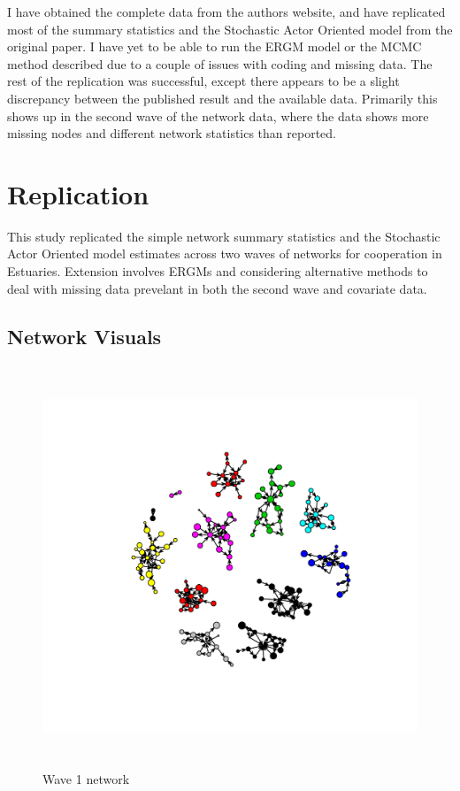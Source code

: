 \documentclass[12pt]{article} %
\numberwithin{equation}{section}		%
\numberwithin{figure}{section}			%
\numberwithin{table}{section}				%
\begin{document}
I have obtained the complete data from the authors website, and have replicated most of the summary statistics and the Stochastic Actor Oriented model from the original paper. I have yet to be able to run the ERGM model or the MCMC method described due to a couple of issues with coding and missing data. The rest of the replication was successful, except there appears to be a slight discrepancy between the published result and the available data. Primarily this shows up in the second wave of the network data, where the data shows more missing nodes and different network statistics than reported.

\section{Replication}
This study replicated the simple network summary statistics and the Stochastic Actor Oriented model estimates across two waves of networks for cooperation in Estuaries. Extension involves ERGMs and considering alternative methods to deal with missing data prevelant in both the second wave and covariate data.

\subsection{Network Visuals}
\begin{figure}[!ht]
      \includegraphics[width=16cm, height = 12cm]{wave1PlotT.pdf}
      \caption{Wave 1 network}\label{fig:x1}
\end{figure}
\end{document}

